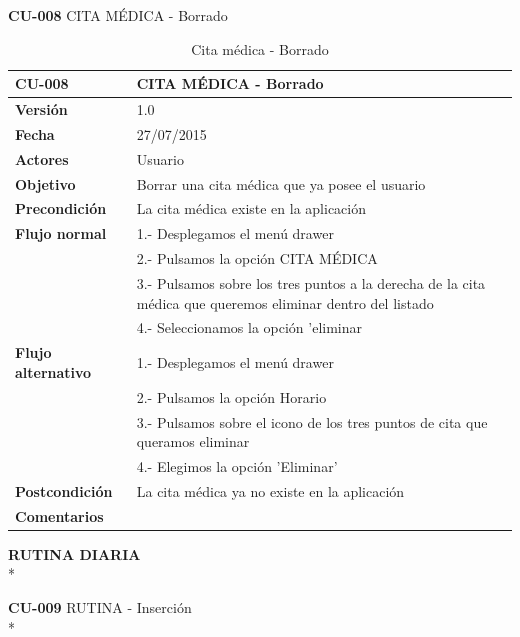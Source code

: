 \documentclass[../pfc.tex]{subfiles}
\begin{document}
	\clearpage
	
	\textbf{CU-008}	CITA MÉDICA - Borrado
	
		\begin{table}[H]
			\centering
			\begin{tabular}[t]{|p{3cm}|p{9.5cm}|}
				\hline \textbf{CU-008} & \textbf{CITA MÉDICA - Borrado} \\*
				\hline\hline \textbf{Versión} & 1.0 \\*
				\hline\hline \textbf{Fecha} & 27/07/2015 \\*
				\hline\textbf{Actores} 	& Usuario\\*
				\hline \textbf{Objetivo} & Borrar una cita médica que ya posee el usuario\\* 			
				\hline \textbf{Precondición} & La cita médica existe en la aplicación\\* 
				\hline \textbf{Flujo normal} & 1.- Desplegamos el menú drawer \\* 
				& 2.- Pulsamos la opción CITA MÉDICA\\*	
				& 3.- Pulsamos sobre los tres puntos a la derecha de la cita médica que queremos eliminar dentro del listado\\*	
				& 4.- Seleccionamos la opción 'eliminar\\*	
				\hline \textbf{Flujo alternativo} & 1.- Desplegamos el menú drawer \\* 
				& 2.- Pulsamos la opción Horario \\*	
				& 3.- Pulsamos sobre el icono de los tres puntos de cita que queramos eliminar \\*	
				& 4.- Elegimos la opción 'Eliminar'\\*	
				\hline \textbf{Postcondición} & La cita médica ya no existe en la aplicación \\* 
				\hline \textbf{Comentarios}   & \\*
				\hline
			\end{tabular}
			\caption{Cita médica - Borrado}
			\label{tabla:caso008}
		\end{table}

	\clearpage
	
	\textbf{RUTINA DIARIA}\\*
		
	\textbf{CU-009}	RUTINA - Inserción\\*
		
\end{document}
